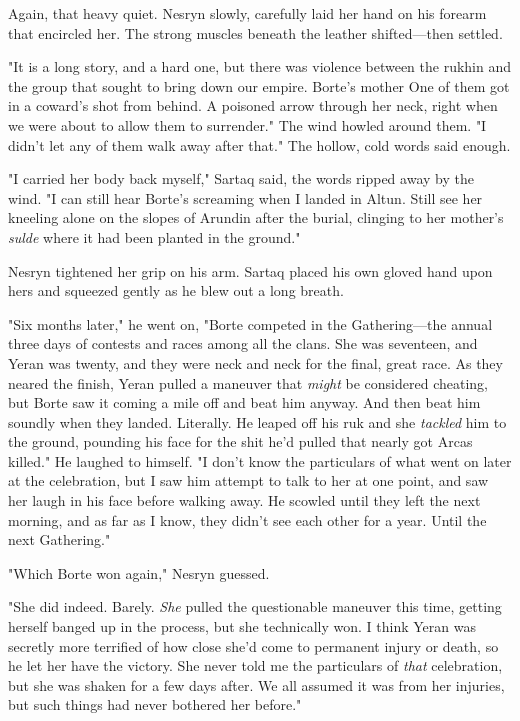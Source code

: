 Again, that heavy quiet. Nesryn slowly, carefully laid her hand on his forearm that encircled her. The strong muscles beneath the leather shifted---then settled.

"It is a long story, and a hard one, but there was violence between the rukhin and the group that sought to bring down our empire. Borte's mother  One of them got in a coward's shot from behind. A poisoned arrow through her neck, right when we were about to allow them to surrender." The wind howled around them. "I didn't let any of them walk away after that." The hollow, cold words said enough.

"I carried her body back myself," Sartaq said, the words ripped away by the wind. "I can still hear Borte's screaming when I landed in Altun. Still see her kneeling alone on the slopes of Arundin after the burial, clinging to her mother's \emph{sulde} where it had been planted in the ground."

Nesryn tightened her grip on his arm. Sartaq placed his own gloved hand upon hers and squeezed gently as he blew out a long breath.

"Six months later," he went on, "Borte competed in the Gathering---the annual three days of contests and races among all the clans. She was seventeen, and Yeran was twenty, and they were neck and neck for the final, great race. As they neared the finish, Yeran pulled a maneuver that \emph{might} be considered cheating, but Borte saw it coming a mile off and beat him anyway. And then beat him soundly when they landed. Literally. He leaped off his ruk and she \emph{tackled} him to the ground, pounding his face for the shit he'd pulled that nearly got Arcas killed." He laughed to himself. "I don't know the particulars of what went on later at the celebration, but I saw him attempt to talk to her at one point, and saw her laugh in his face before walking away. He scowled until they left the next morning, and as far as I know, they didn't see each other for a year. Until the next Gathering."

"Which Borte won again," Nesryn guessed.

"She did indeed. Barely. \emph{She} pulled the questionable maneuver this time, getting herself banged up in the process, but she technically won. I think Yeran was secretly more terrified of how close she'd come to permanent injury or death, so he let her have the victory. She never told me the particulars of \emph{that} celebration, but she was shaken for a few days after. We all assumed it was from her injuries, but such things had never bothered her before."

